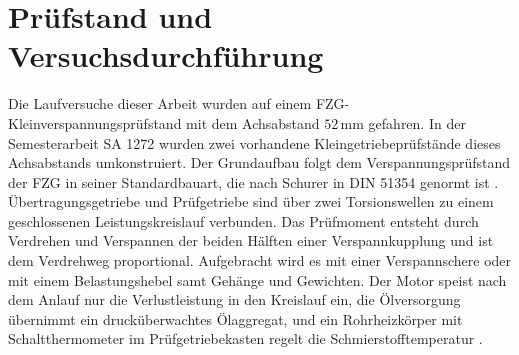 
\section{Prüfstand und Versuchsdurchführung}
\label{sec:pruefstand}

Die Laufversuche dieser Arbeit wurden auf einem FZG-Kleinverspannungsprüfstand mit dem Achsabstand $52$\,mm gefahren. In der Semesterarbeit SA 1272 wurden zwei vorhandene Kleingetriebeprüfstände dieses Achsabstands umkonstruiert. Der Grundaufbau folgt dem Verspannungsprüfstand der FZG in seiner Standardbauart, die nach Schurer in DIN 51354 genormt ist \cite[S.~2 und 8]{Schu09}. Übertragungsgetriebe und Prüfgetriebe sind über zwei Torsionswellen zu einem geschlossenen Leistungskreislauf verbunden. Das Prüfmoment entsteht durch Verdrehen und Verspannen der beiden Hälften einer Verspannkupplung und ist dem Verdrehweg proportional. Aufgebracht wird es mit einer Verspannschere oder mit einem Belastungshebel samt Gehänge und Gewichten. Der Motor speist nach dem Anlauf nur die Verlustleistung in den Kreislauf ein, die Ölversorgung übernimmt ein drucküberwachtes Ölaggregat, und ein Rohrheizkörper mit Schaltthermometer im Prüfgetriebekasten regelt die Schmierstofftemperatur \cite[S.~8]{Schu09}.

